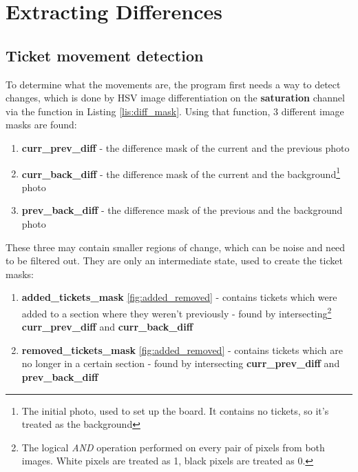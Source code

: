 \documentclass[12pt]{report}
\theoremstyle{definition}
\theoremstyle{remark}
\begin{document}
\chapter{Extracting Differences}
\section{Ticket movement detection}
To determine what the movements are, the program first needs a way to detect changes, which is done by HSV image differentiation on the \textbf{saturation} channel via the function in Listing \ref{lis:diff_mask}. Using that function, 3 different image masks are found:

\begin{enumerate}
    \item \textbf{curr\_prev\_diff} - the difference mask of the current and the previous photo
    \item \textbf{curr\_back\_diff} - the difference mask of the current and the background\footnote{The initial photo, used to set up the board. It contains no tickets, so it's treated as the background} photo
    \item \textbf{prev\_back\_diff} - the difference mask of the previous and the background photo
\end{enumerate}

These three may contain smaller regions of change, which can be noise and need to be filtered out. They are only an intermediate state, used to create the ticket masks:
\begin{enumerate}
    \item \textbf{added\_tickets\_mask} \ref{fig:added_removed} - contains tickets which were added to a section where they weren't previously - found by intersecting\footnote{The logical \textit{AND} operation performed on every pair of pixels from both images. White pixels are treated as 1, black pixels are treated as 0.} \textbf{curr\_prev\_diff} and \textbf{curr\_back\_diff}
    \item \textbf{removed\_tickets\_mask} \ref{fig:added_removed} - contains tickets which are no longer in a certain section - found by intersecting \textbf{curr\_prev\_diff} and \textbf{prev\_back\_diff}
\end{enumerate}
\end{document}
